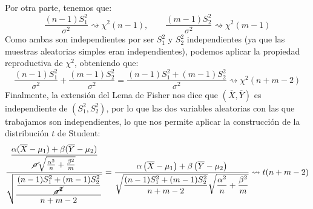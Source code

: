 \begin{ejercicio}
\begin{equation*}
    \end{equation*}
    Por otra parte, tenemos que:
    \begin{equation*}
        \dfrac{(n-1)S_1^2}{\sigma^2} \rightsquigarrow\chi^2(n-1), \qquad 
        \dfrac{(m-1)S_2^2}{\sigma^2} \rightsquigarrow\chi^2(m-1) 
    \end{equation*}
    Como ambas son independientes por ser $S_1^2$ y $S_2^2$ independientes (ya que las muestras aleatorias simples eran independientes), podemos aplicar la propiedad reproductiva de $\chi^2$, obteniendo que:
    \begin{equation*}
        \dfrac{(n-1)S_1^2}{\sigma^2} + \dfrac{(m-1)S_2^2}{\sigma^2} = \dfrac{(n-1)S_1^2+(m-1)S_2^2}{\sigma^2}\rightsquigarrow\chi^2(n+m-2) 
    \end{equation*}
    Finalmente, la extensión del Lema de Fisher nos dice que $(\overline{X},\overline{Y})$ es independiente de $(S_1^2, S_2^2)$, por lo que las dos variables aleatorias con las que trabajamos son independientes, lo que nos permite aplicar la construcción de la distribución $t$ de Student:
    \begin{equation*}
        \dfrac{\dfrac{\alpha(\overline{X}-\mu_1 ) +\beta(\overline{Y}-\mu_2) }{\cancel{\sigma}\sqrt{\frac{\alpha^2}{n}+\frac{\beta^2}{m}}}}{\sqrt{\dfrac{\dfrac{(n-1)S_1^2+(m-1)S_2^2}{\cancel{\sigma^2}}}{n+m-2}}} = \dfrac{\alpha\left(\overline{X}-\mu_1\right)+\beta\left(\overline{Y}-\mu_2\right)}{\sqrt{\dfrac{(n-1)S_1^2 + (m-1)S_2^2}{n+m-2}} \sqrt{\dfrac{\alpha^2}{n} + \dfrac{\beta^2}{m}}} \rightsquigarrow t(n+m-2)
    \end{equation*}
\end{ejercicio}


